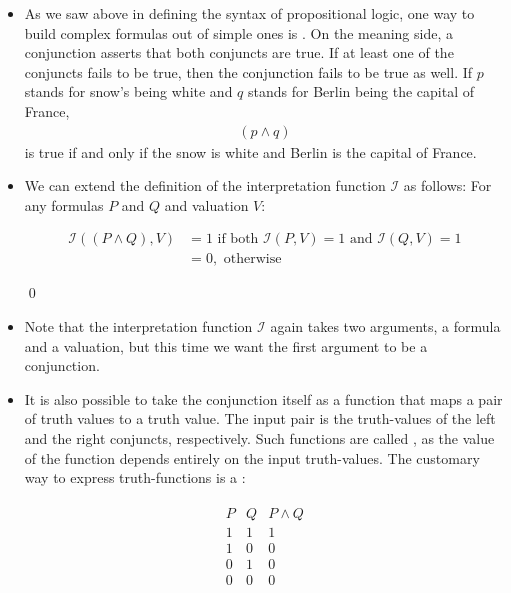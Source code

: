 \documentclass[11pt]{article}
\begin{document}
\begin{itemize}

\item As we saw above in defining the syntax of propositional logic, one way to
build complex formulas out of simple ones is
. On the meaning side, a conjunction asserts that both
conjuncts are true. If at least one of the conjuncts fails to be true, then the
conjunction fails to be true as well. If $p$ stands for snow's being white and
$q$ stands for Berlin being the capital of France, 
\begin{align}
(p \land q)
\end{align}
is true if and only if the snow is white and Berlin is the capital of France.

\item We can extend the definition of the interpretation function $\mathcal{I}$ as
follows: For any formulas $P$ and $Q$ and valuation $V$:


\begin{udefinition} \label{iconj}
\begin{align*}
\mathcal{I}((P\land Q),V) & = 1 \text{ if both } \mathcal{I}(P,V) = 1 \text{ and }
\mathcal{I}(Q,V) = 1\\ 
& = 0, \text{ otherwise}\nonumber
\end{align*}

\qed
\end{udefinition}

\item Note that the interpretation function $\mathcal{I}$ again takes two
arguments, a formula and a valuation, but this time we want the first argument
to be a conjunction.

\item It is also possible to take the conjunction itself as a function that maps
a pair of truth values to a truth value. The input pair is the truth-values of
the left and the right conjuncts, respectively. Such functions are called
, as the value of the function depends entirely on the
input truth-values. The customary way to express truth-functions is a
: 

\begin{align}
\begin{array}{c|c|c}
P & Q & P \land Q \\ \hline
1 & 1 & 1\\
1 & 0 & 0\\
0 & 1 & 0\\
0 & 0 & 0
\end{array}
\end{align}


\end{itemize}
\end{document}
